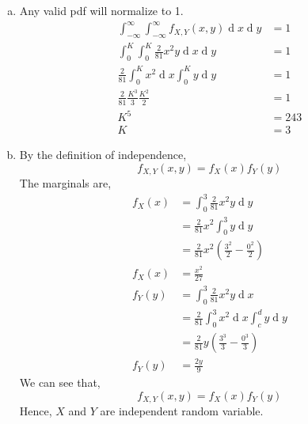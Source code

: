 \documentclass[answers]{exam}
\begin{document}
\begin{questions}
    \begin{framed}
        \begin{enumerate}[(a)]
            \item Any valid pdf will normalize to 1.
                  \begin{equation*}
                      \begin{split}
                          \int_{-\infty}^{\infty}\int_{-\infty}^{\infty}f_{X,Y}(x,y)\operatorname{d}x\operatorname{d}y & = 1\\
                          \int_{0}^{K}\int_{0}^{K}\frac{2}{81}x^2y\operatorname{d}x\operatorname{d}y & = 1\\
                          \frac{2}{81}\int_{0}^{K}x^2\operatorname{d}x\int_{0}^{K}y\operatorname{d}y & = 1\\
                          \frac{2}{81}\frac{K^3}{3}\frac{K^2}{2} & = 1\\
                          K^5 & = 243\\
                          K & = 3
                      \end{split}
                  \end{equation*}
            \item By the definition of independence,
                  \[f_{X,Y}(x,y)=f_X(x)f_Y(y)\]
                  The marginals are,
                  \begin{equation*}
                      \begin{split}
                          f_X(x) & = \int_{0}^{3}\frac{2}{81}x^2 y\operatorname{d}y\\
                          & = \frac{2}{81}x^2\int_{0}^{3}y\operatorname{d}y\\
                          & = \frac{2}{81}x^2\left(\frac{3^2}{2}-\frac{0^2}{2}\right)\\
                          f_X(x) & = \frac{x^2}{27}\\
                          f_Y(y) & = \int_{0}^{3}\frac{2}{81}x^2y\operatorname{d}x\\
                          & = \frac{2}{81}\int_{0}^{3}x^2\operatorname{d}x\int_{c}^{d}y\operatorname{d}y\\
                          & = \frac{2}{81}y\left(\frac{3^3}{3}-\frac{0^3}{3}\right)\\
                          f_Y(y) & = \frac{2y}{9}
                      \end{split}
                  \end{equation*}
                  We can see that,
                  \[f_{X,Y}(x,y)=f_X(x)f_Y(y)\]
                  Hence, $X$ and $Y$ are independent random variable.
        \end{enumerate}
    \end{framed}


\end{questions}
\end{document}
